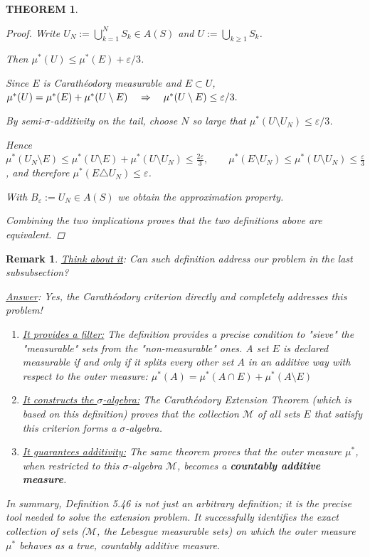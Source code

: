\documentclass[12pt]{article}
\theoremstyle{blueplain}
\newtheorem{theorem}{THEOREM}[section]
\theoremstyle{bluedef}
\theoremstyle{blueremark}
\newtheorem{remark}{Remark}[section]
\numberwithin{equation}{section}
\begin{document}
\begin{theorem}
\begin{proof}
    Write $U_N:=\bigcup_{k=1}^N S_k\in A(S)$ and $U:=\bigcup_{k\ge1} S_k$.

    Then $\mu^*(U)\le \mu^*(E)+\varepsilon/3$.

    Since $E$ is Carath\'eodory measurable and $E\subset U$, \(\mu^*(U)=\mu^*(E)+\mu^*(U\setminus E)\quad$

    $\Rightarrow\quad \mu^*(U\setminus E)\le \varepsilon/3.\)

    By semi-$\sigma$-additivity on the tail, choose $N$ so large that $\mu^*(U\setminus U_N)\le \varepsilon/3$.

    Hence \(\mu^*(U_N\setminus E)\le \mu^*(U\setminus E)+\mu^*(U\setminus U_N)\le \tfrac{2\varepsilon}{3},\qquad \mu^*(E\setminus U_N)\le \mu^*(U\setminus U_N)\le \tfrac{\varepsilon}{3}\), and therefore $\mu^*(E\triangle U_N)\le \varepsilon$.

    With $B_\varepsilon:=U_N\in A(S)$ we obtain the approximation property.

    Combining the two implications proves that the two definitions above are equivalent.
  \end{proof}
\end{theorem}

\begin{remark}
  \underline{Think about it}: Can such definition address our problem in the last subsubsection?

  \underline{Answer}: Yes, the Carathéodory criterion directly and completely addresses this problem!

  \begin{enumerate}
    \item \underline{It provides a filter:} The definition provides a precise condition to "sieve" the "measurable" sets from the "non-measurable" ones. A set $E$ is declared measurable if and only if it splits \emph{every} other set $A$ in an additive way with respect to the outer measure:
          $\mu^*(A) = \mu^*(A \cap E) + \mu^*(A \setminus E)$

    \item \underline{It constructs the $\sigma$-algebra:} The Carathéodory Extension Theorem (which is based on this definition) proves that the collection $\mathcal{M}$ of all sets $E$ that satisfy this criterion forms a $\sigma$-algebra.

    \item \underline{It guarantees additivity:} The same theorem proves that the outer measure $\mu^*$, when restricted to this $\sigma$-algebra $\mathcal{M}$, becomes a \textbf{countably additive measure}.
  \end{enumerate}

  In summary, Definition 5.46 is not just an arbitrary definition; it is the precise tool needed to solve the extension problem. It successfully identifies the exact collection of sets ($\mathcal{M}$, the Lebesgue measurable sets) on which the outer measure $\mu^*$ behaves as a true, countably additive measure.

\end{remark}
\end{document}
